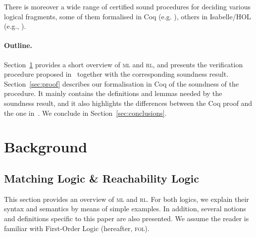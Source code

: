 \documentclass[conference]{IEEEtran}
\newenvironment{todo}{\medskip\hrule\smallskip\noindent}{\smallskip\hrule\medskip}
\newcommand{\dl}[1]{\begin{todo}\textcolor{blue}{Dorel:}\\ \color{red}{#1}\color{black}\end{todo}}
\newcommand{\dl}[1]{}
\newcommand{\ML}{\textsc{ml}\xspace}
\newcommand{\FOL}{\textsc{fol}\xspace}
\newcommand{\RL}{\textsc{rl}\xspace}
\begin{document}
There is moreover a wide range of certified sound procedures for deciding various logical fragments, some of them formalised in Coq (e.g. \cite{DBLP:journals/corr/abs-1105-4537, DBLP:conf/types/Besson06}), others in Isabelle/HOL (e.g., \cite{ChaiebN-LPAR05}).


\paragraph{Outline.} 

Section~\ref{sec:background} provides a short overview of \ML and \RL, and presents the verification procedure proposed in~\cite{lucanu-rusu-arusoaie-nowak-LRC2015} together with the corresponding soundness result.
Section~\ref{sec:proof} describes our formalisation in Coq of the soundness of the procedure.
It mainly contains the definitions and lemmas needed by the soundness result, and it also highlights the differences between the Coq proof and the one in~\cite{lucanu-rusu-arusoaie-nowak-LRC2015}.
We conclude in Section~\ref{sec:conclusions}.




\section{Background}
\label{sec:background}
\subsection{Matching Logic \& Reachability Logic}
\label{sec:intro}
This section provides an overview of \ML and \RL.
For both logics, we explain their syntax and semantics by means of simple examples. 
In addition, several notions and definitions specific to this paper are also presented.
We assume the reader is familiar with First-Order Logic (hereafter, \FOL).
\end{document}
